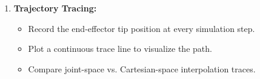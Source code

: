 \documentclass[11pt, a4paper]{article}
\begin{document}
\begin{enumerate}
    \item \textbf{Trajectory Tracing:}
    \begin{itemize}
        \item Record the end-effector tip position at every simulation step.
        \item Plot a continuous trace line to visualize the path.
        \item Compare joint-space vs. Cartesian-space interpolation traces.
    \end{itemize}
\end{enumerate}
\end{document}
